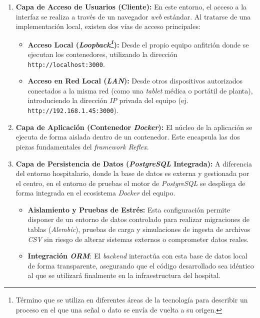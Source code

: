 \begin{enumerate}
	\item \textbf{Capa de Acceso de Usuarios (Cliente):} En este entorno, el acceso a la interfaz se realiza a través de un navegador \textit{web} estándar. Al tratarse de una implementación local, existen dos vías de acceso principales:
	\begin{itemize}
		\item \textbf{Acceso Local (\textit{Loopback\footnote{Término que se utiliza en diferentes áreas de la tecnología para describir un proceso en el que una señal o dato se envía de vuelta a su origen.}}):} Desde el propio equipo anfitrión donde se ejecutan los contenedores, utilizando la dirección \texttt{http://localhost:3000}.
		\item \textbf{Acceso en Red Local (\textit{LAN}):} Desde otros dispositivos autorizados conectados a la misma red (como una \textit{tablet} médica o portátil de planta), introduciendo la dirección \textit{IP} privada del equipo (ej. \texttt{http://192.168.1.45:3000}).
	\end{itemize}
	
	\item \textbf{Capa de Aplicación (Contenedor \textit{Docker}):} El núcleo de la aplicación se ejecuta de forma aislada dentro de un contenedor. Este encapsula las dos piezas fundamentales del \textit{framework Reflex}.
	
	\item \textbf{Capa de Persistencia de Datos (\textit{PostgreSQL} Integrada):} A diferencia del entorno hospitalario, donde la base de datos es externa y gestionada por el centro, en el entorno de pruebas el motor de \textit{PostgreSQL} se despliega de forma integrada en el ecosistema \textit{Docker} del equipo.
	\begin{itemize}
		\item \textbf{Aislamiento y Pruebas de Estrés:} Esta configuración permite disponer de un entorno de datos controlado para realizar migraciones de tablas (\textit{Alembic}), pruebas de carga y simulaciones de ingesta de archivos \textit{CSV} sin riesgo de alterar sistemas externos o comprometer datos reales.
		
		\item \textbf{Integración \textit{ORM}}: El \textit{backend} interactúa con esta base de datos local de forma transparente, asegurando que el código desarrollado sea idéntico al que se utilizará finalmente en la infraestructura del hospital.
	\end{itemize}
\end{enumerate}


